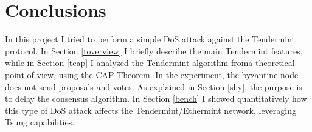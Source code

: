 \documentclass[]{article}
\begin{document}
\section{Conclusions}
In this project I tried to perform a simple DoS attack against the Tendermint protocol. In Section \ref{toverview} I briefly describe the main Tendermint features, while in Section \ref{tcap} I analyzed the Tendermint algorithm froma theoretical point of view, using the CAP Theorem. In the experiment, the byzantine node does not send proposals and votes. As explained in Section \ref{shy}, the purpose is to delay the consensus algorithm. In Section \ref{bench} I showed quantitatively how this type of DoS attack affects the Tendermint/Ethermint network, leveraging Tsung capabilities.


	
\end{document}
